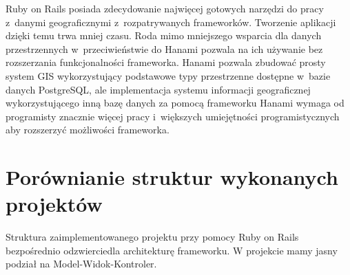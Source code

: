 \documentclass[printmode]{mgr}
\begin{document}
Ruby on Rails posiada zdecydowanie najwięcej gotowych narzędzi do pracy z~danymi geograficznymi z~rozpatrywanych frameworków. Tworzenie aplikacji dzięki temu trwa mniej czasu. Roda mimo mniejszego wsparcia dla danych przestrzennych w~przeciwieństwie do Hanami pozwala na ich używanie bez rozszerzania funkcjonalności frameworka. Hanami pozwala zbudować prosty system GIS wykorzystujący podstawowe typy przestrzenne dostępne w~bazie danych PostgreSQL, ale implementacja systemu informacji geograficznej wykorzystującego inną bazę danych za pomocą frameworku Hanami wymaga od programisty znacznie więcej pracy i~większych umiejętności programistycznych aby rozszerzyć możliwości frameworka.

\newpage

\section{Porównianie struktur wykonanych projektów}

Struktura zaimplementowanego projektu przy pomocy Ruby on Rails bezpośrednio odzwierciedla architekturę frameworku. W projekcie mamy jasny podział na Model-Widok-Kontroler. 
\end{document}
